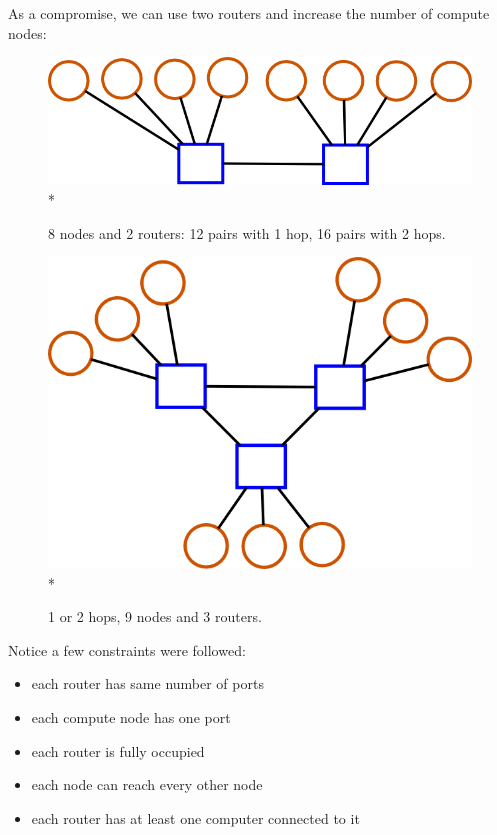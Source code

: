 \documentclass[pdftex]{article}
\begin{document}
As a compromise, we can use two routers and increase the number of compute nodes:

\begin{figure}[h!]
\begin{center}
\includegraphics[scale=0.2]{pictures/N8_n1_M2_m5.png}\\*
\caption{8 nodes and 2 routers: 12 pairs with 1 hop, 16 pairs with 2 hops.}
\end{center}
\end{figure}

\begin{figure}[h!]
\begin{center}
\includegraphics[scale=0.2]{pictures/N9_n1_M4_m5.png}\\*
\caption{1 or 2 hops, 9 nodes and 3 routers.}
\end{center}
\end{figure}
Notice a few constraints were followed:
\begin{itemize}
 \item each router has same number of ports
 \item each compute node has one port
 \item each router is fully occupied
 \item each node can reach every other node
 \item each router has at least one computer connected to it
\end{itemize}
\end{document}
